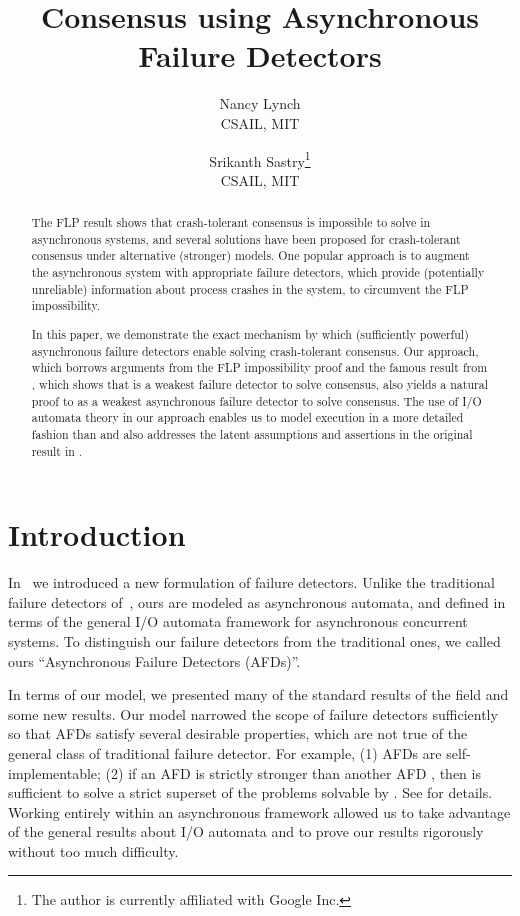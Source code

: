 \documentclass[11pt]{article}
\title{Consensus using Asynchronous Failure Detectors}
\author{Nancy Lynch \\
CSAIL, MIT
\and Srikanth Sastry\footnote{The author is currently affiliated with Google Inc.}\\
CSAIL, MIT}
\date{}
\numberwithin{theorem}{section}
\begin{document}
\maketitle

\begin{abstract}
The FLP result shows that crash-tolerant consensus is impossible to solve in asynchronous systems, and several solutions have been proposed for crash-tolerant consensus under alternative (stronger) models. One popular approach is to augment the asynchronous system with appropriate failure detectors, which provide (potentially unreliable) information about process crashes in the system, to circumvent the FLP impossibility.  

In this paper, we demonstrate the exact mechanism by which (sufficiently powerful) asynchronous failure detectors enable solving crash-tolerant consensus. Our approach, which borrows arguments from the FLP impossibility proof and the famous result from \cite{chan:twfdf}, which shows that  is a weakest failure detector to solve consensus, also yields a natural proof to  as a weakest asynchronous failure detector to solve consensus. The use of I/O automata theory in our approach enables us to model execution in a more detailed fashion than \cite{chan:twfdf} and also addresses the latent assumptions and assertions in the original result in \cite{chan:twfdf}.
\end{abstract}

\section{Introduction}



In~\cite{cornejoetalAFD,cornejoetalAFD-TR}
we introduced a new formulation of failure detectors.  Unlike the
traditional failure detectors of~\cite{chan:ufdfr, chan:twfdf}, ours are modeled as
asynchronous automata, and defined in terms of the general I/O
automata framework for asynchronous concurrent systems.
To distinguish our failure detectors from the traditional ones, we
called ours ``Asynchronous Failure Detectors (AFDs)''.

In terms of our model, we presented many of the standard results of
the field and some new results.
Our model narrowed the scope of failure detectors sufficiently so that
AFDs satisfy several desirable properties, which are not true of the
general class of traditional failure detector. For example,
(1) AFDs are self-implementable; (2) if an AFD  is strictly stronger
than another AFD , then  is sufficient to solve a strict superset
of the problems solvable by . See \cite{cornejoetalAFD-TR} for details. 
Working entirely within an asynchronous framework allowed us to take
advantage of the general results about I/O automata and to prove
our results rigorously without too much difficulty.
\end{document}
